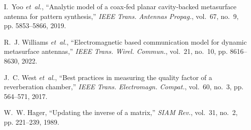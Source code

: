 \documentclass[journal,12pt,onecolumn,draftclsnofoot]{IEEEtran}
\begin{document}
\begin{thebibliography}{10}
I.~Yoo \emph{et~al.}, ``Analytic model of a coax-fed planar cavity-backed
  metasurface antenna for pattern synthesis,'' \emph{IEEE Trans. Antennas
  Propag.}, vol.~67, no.~9, pp. 5853--5866, 2019.

R.~J. Williams \emph{et~al.}, ``Electromagnetic based communication model for
  dynamic metasurface antennas,'' \emph{IEEE Trans. Wirel. Commun.}, vol.~21,
  no.~10, pp. 8616--8630, 2022.

J.~C. West \emph{et~al.}, ``Best practices in measuring the quality factor of a
  reverberation chamber,'' \emph{IEEE Trans. Electromagn. Compat.}, vol.~60,
  no.~3, pp. 564--571, 2017.

W.~W. Hager, ``Updating the inverse of a matrix,'' \emph{SIAM Rev.}, vol.~31,
  no.~2, pp. 221--239, 1989.

\end{thebibliography}
\end{document}
